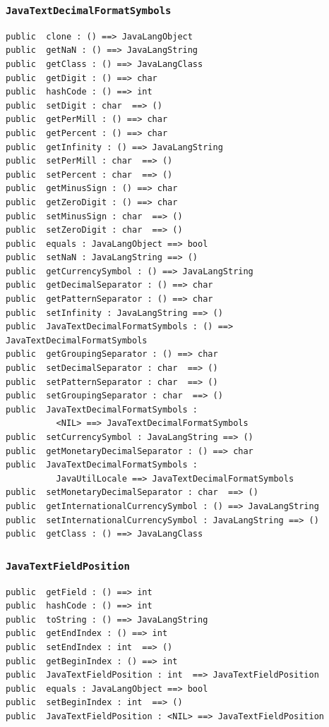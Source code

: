 \documentclass[\pformat,12pt]{article}
\begin{document}
\subsubsection{\texttt{JavaTextDecimalFormatSymbols}}
\begin{small}
\begin{verbatim}
public  clone : () ==> JavaLangObject
public  getNaN : () ==> JavaLangString
public  getClass : () ==> JavaLangClass
public  getDigit : () ==> char
public  hashCode : () ==> int
public  setDigit : char  ==> ()
public  getPerMill : () ==> char
public  getPercent : () ==> char
public  getInfinity : () ==> JavaLangString
public  setPerMill : char  ==> ()
public  setPercent : char  ==> ()
public  getMinusSign : () ==> char
public  getZeroDigit : () ==> char
public  setMinusSign : char  ==> ()
public  setZeroDigit : char  ==> ()
public  equals : JavaLangObject ==> bool
public  setNaN : JavaLangString ==> ()
public  getCurrencySymbol : () ==> JavaLangString
public  getDecimalSeparator : () ==> char
public  getPatternSeparator : () ==> char
public  setInfinity : JavaLangString ==> ()
public  JavaTextDecimalFormatSymbols : () ==> JavaTextDecimalFormatSymbols
public  getGroupingSeparator : () ==> char
public  setDecimalSeparator : char  ==> ()
public  setPatternSeparator : char  ==> ()
public  setGroupingSeparator : char  ==> ()
public  JavaTextDecimalFormatSymbols : 
          <NIL> ==> JavaTextDecimalFormatSymbols
public  setCurrencySymbol : JavaLangString ==> ()
public  getMonetaryDecimalSeparator : () ==> char
public  JavaTextDecimalFormatSymbols : 
          JavaUtilLocale ==> JavaTextDecimalFormatSymbols
public  setMonetaryDecimalSeparator : char  ==> ()
public  getInternationalCurrencySymbol : () ==> JavaLangString
public  setInternationalCurrencySymbol : JavaLangString ==> ()
public  getClass : () ==> JavaLangClass
\end{verbatim}
\end{small}

\subsubsection{\texttt{JavaTextFieldPosition}}
\begin{small}
\begin{verbatim}
public  getField : () ==> int
public  hashCode : () ==> int
public  toString : () ==> JavaLangString
public  getEndIndex : () ==> int
public  setEndIndex : int  ==> ()
public  getBeginIndex : () ==> int
public  JavaTextFieldPosition : int  ==> JavaTextFieldPosition
public  equals : JavaLangObject ==> bool
public  setBeginIndex : int  ==> ()
public  JavaTextFieldPosition : <NIL> ==> JavaTextFieldPosition
\end{verbatim}
\end{small}
\end{document}

